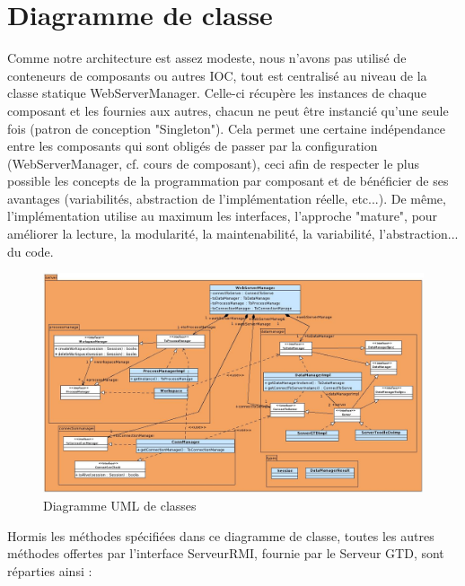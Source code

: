     \section{Diagramme de classe}

    Comme notre architecture est assez modeste, nous n'avons pas utilisé de conteneurs de composants ou autres IOC, tout est centralisé au niveau de la classe statique WebServerManager. Celle-ci récupère les instances de chaque composant et les fournies aux autres, chacun ne peut être instancié qu'une seule fois (patron de conception "Singleton"). Cela permet une certaine indépendance entre les composants qui sont obligés de passer par la configuration (WebServerManager, cf. cours de composant), ceci afin de respecter le plus possible les concepts de la programmation par composant et de bénéficier de ses avantages (variabilités, abstraction de l'implémentation réelle, etc...). De même, l'implémentation utilise au maximum les interfaces, l'approche "mature", pour améliorer la lecture, la modularité, la maintenabilité, la variabilité, l'abstraction... du code.

\begin{figure}[H]
\begin{center}
\includegraphics[scale=0.7,angle=90]{livrable4/diag_classe.jpg}
\caption{Diagramme UML de classes}
\end{center}
\end{figure}

Hormis les méthodes spécifiées dans ce diagramme de classe, toutes les autres méthodes offertes par l'interface ServeurRMI, fournie par le Serveur GTD, sont réparties ainsi : \\

